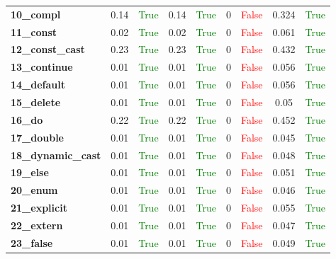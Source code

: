 \documentclass{article}
\begin{document}
\begin{xltabular}{\textwidth}{lcccccccc}
\textbf{10\_compl}& 0.14&\textcolor{green}{True}& 0.14&\textcolor{green}{True}& 0&\textcolor{red}{False}& 0.324&\textcolor{green}{True} \\[0.5ex]
\textbf{11\_const}& 0.02&\textcolor{green}{True}& 0.02&\textcolor{green}{True}& 0&\textcolor{red}{False}& 0.061&\textcolor{green}{True} \\[0.5ex]
\textbf{12\_const\_cast}& 0.23&\textcolor{green}{True}& 0.23&\textcolor{green}{True}& 0&\textcolor{red}{False}& 0.432&\textcolor{green}{True} \\[0.5ex]
\textbf{13\_continue}& 0.01&\textcolor{green}{True}& 0.01&\textcolor{green}{True}& 0&\textcolor{red}{False}& 0.056&\textcolor{green}{True} \\[0.5ex]
\textbf{14\_default}& 0.01&\textcolor{green}{True}& 0.01&\textcolor{green}{True}& 0&\textcolor{red}{False}& 0.056&\textcolor{green}{True} \\[0.5ex]
\textbf{15\_delete}& 0.01&\textcolor{green}{True}& 0.01&\textcolor{green}{True}& 0&\textcolor{red}{False}& 0.05&\textcolor{green}{True} \\[0.5ex]
\textbf{16\_do}& 0.22&\textcolor{green}{True}& 0.22&\textcolor{green}{True}& 0&\textcolor{red}{False}& 0.452&\textcolor{green}{True} \\[0.5ex]
\textbf{17\_double}& 0.01&\textcolor{green}{True}& 0.01&\textcolor{green}{True}& 0&\textcolor{red}{False}& 0.045&\textcolor{green}{True} \\[0.5ex]
\textbf{18\_dynamic\_cast}& 0.01&\textcolor{green}{True}& 0.01&\textcolor{green}{True}& 0&\textcolor{red}{False}& 0.048&\textcolor{green}{True} \\[0.5ex]
\textbf{19\_else}& 0.01&\textcolor{green}{True}& 0.01&\textcolor{green}{True}& 0&\textcolor{red}{False}& 0.051&\textcolor{green}{True} \\[0.5ex]
\textbf{20\_enum}& 0.01&\textcolor{green}{True}& 0.01&\textcolor{green}{True}& 0&\textcolor{red}{False}& 0.046&\textcolor{green}{True} \\[0.5ex]
\textbf{21\_explicit}& 0.01&\textcolor{green}{True}& 0.01&\textcolor{green}{True}& 0&\textcolor{red}{False}& 0.055&\textcolor{green}{True} \\[0.5ex]
\textbf{22\_extern}& 0.01&\textcolor{green}{True}& 0.01&\textcolor{green}{True}& 0&\textcolor{red}{False}& 0.047&\textcolor{green}{True} \\[0.5ex]
\textbf{23\_false}& 0.01&\textcolor{green}{True}& 0.01&\textcolor{green}{True}& 0&\textcolor{red}{False}& 0.049&\textcolor{green}{True} \\[0.5ex]

\end{xltabular}
\end{document}
